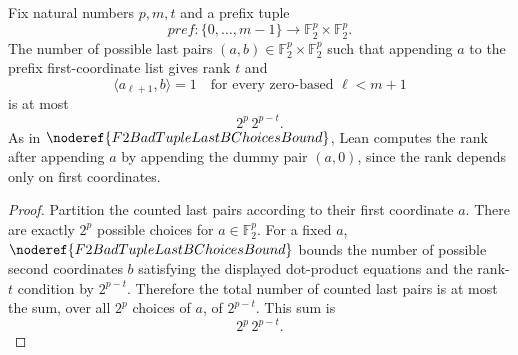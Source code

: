 \begin{helper}
Fix natural numbers \(p,m,t\) and a prefix tuple
\[
  pref:\{0,\ldots,m-1\}\to \mathbb F_2^p\times\mathbb F_2^p.
\]
The number of possible last pairs \((a,b)\in\mathbb F_2^p\times\mathbb F_2^p\)
such that appending \(a\) to the prefix first-coordinate list gives rank \(t\)
and
\[
  \langle a_{\ell+1},b\rangle=1
  \quad\text{for every zero-based }\ell<m+1
\]
is at most
\[
  2^p\,2^{p-t}.
\]
As in \(\noderef{F2BadTupleLastBChoicesBound}\), Lean computes the rank after
appending \(a\) by appending the dummy pair \((a,0)\), since the rank depends
only on first coordinates.
\end{helper}
\begin{proof}
Partition the counted last pairs according to their first coordinate \(a\).
There are exactly \(2^p\) possible choices for \(a\in\mathbb F_2^p\). For a
fixed \(a\), \(\noderef{F2BadTupleLastBChoicesBound}\) bounds the number of
possible second coordinates \(b\) satisfying the displayed dot-product
equations and the rank-\(t\) condition by \(2^{p-t}\). Therefore the total
number of counted last pairs is at most the sum, over all \(2^p\) choices of
\(a\), of \(2^{p-t}\). This sum is
\[
  2^p\,2^{p-t}.
\]
\end{proof}
